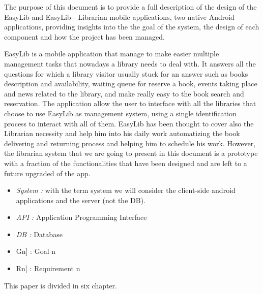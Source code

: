 \vspace*{-5mm}

The purpose of this document is to provide a full description of the design of the
EasyLib and EasyLib - Librarian mobile applications, two native Android applications, providing insights into the the goal of the system, the design of each component and how the project has been managed.

EasyLib is a mobile application that manage to make easier multiple management tasks that nowadays a library needs to deal with. It answers all the questions for which a library visitor usually stuck for an answer such as books description and availability, waiting queue for reserve a book, events taking place and news related to the library, and make really easy to the book search and reservation. The application allow the user to interface with all the libraries that choose to use EasyLib as management system, using a single identification process to interact with all of them.
EasyLib has been thought to cover also the Librarian necessity and help him into his daily work automatizing the book delivering and returning process and helping him to schedule his work. However, the librarian system that we are going to present in this document is a prototype with a fraction of the functionalities that have been designed and are left to a future upgraded of the app.


\begin{itemize}
	\item \emph{System :} with the term system we will consider the client-side android applications and the server (not the DB).
\end{itemize}

\begin{itemize}
	\setlength{\leftskip}{0.5cm}
	\item \emph{API :} Application Programming Interface
	\item \emph{DB :} Database
\end{itemize}

\begin{itemize}
	\setlength{\leftskip}{0.5cm}
	\item \lbrack Gn] : Goal n
	\item \lbrack Rn] : Requirement n
\end{itemize}

This paper is divided in six chapter.\\

